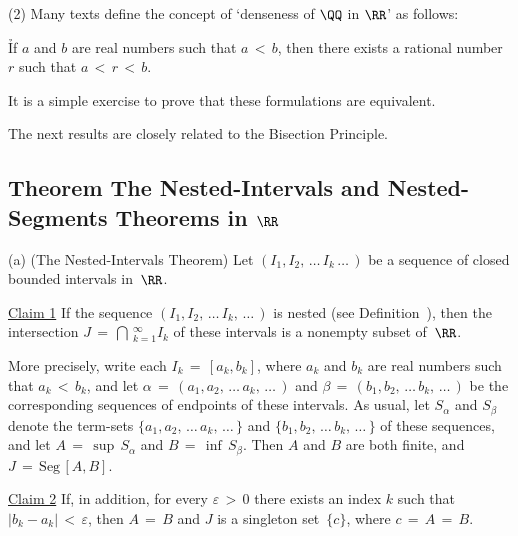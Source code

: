 \V

        (2) Many texts define the concept of `denseness of ${\QQ}$ in ${\RR}$' as follows:

\VA

        \h If $a$ and $b$ are real numbers such that $a\,<\,b$,
    then there exists a rational number $r$ such that $a\,<\,r\,<\,b$.

\VA

\hspace*{\parindent} It is a simple exercise to prove that these formulations are equivalent. %

\VV

        The next results are closely related to the Bisection Principle.

\V


            \subsection{\small{\bf Theorem} The Nested-Intervals and Nested-Segments Theorems in ${\RR}$}
            \label{ThmC20.40}

\V

\hspace*{\parindent}(a) (The Nested-Intervals Theorem) Let $(I_{1}, I_{2},\,{\ldots}\,I_{k}\,{\ldots}\,)$
    be a sequence of closed bounded intervals in~${\RR}$.

         \underline{Claim 1} If the sequence $(I_{1}, I_{2},\,{\ldots}\,I_{k},\,{\ldots}\,)$ is nested
    (see Definition~), then the intersection $J \,=\, {\bigcap}\,_{k=1}^{{\infty}} I_{k}$
    of these intervals is a nonempty subset of~${\RR}$.

        More precisely, write each $I_{k} \,=\, [a_{k},b_{k}]$, where $a_{k}$ and $b_{k}$ are real numbers such that $a_{k}\,<\,b_{k}$,
    and let ${\alpha} \,=\, (a_{1}, a_{2},\,{\ldots}\,a_{k},\,{\ldots}\,)$ and ${\beta} \,=\, (b_{1}, b_{2},\,{\ldots}\,b_{k},\,{\ldots}\,)$
    be the corresponding sequences of endpoints of these intervals. As usual, let $S_{{\alpha}}$ and $S_{{\beta}}$ denote the term-sets
    $\{a_{1}, a_{2},\,{\ldots}\,a_{k}, \,{\ldots}\,\}$ and $\{b_{1},b_{2},\,{\ldots}\,b_{k},\,{\ldots}\,\}$ of these sequences,
    and let $A \,=\, {\sup}\,S_{{\alpha}}$ and $B \,=\, {\inf}\,S_{{\beta}}$. Then $A$ and $B$ are both finite, and $J \,=\, \mbox{Seg}\,[A,B]$.

        \underline{Claim 2} If, in addition, for every ${\varepsilon}\,>\,0$ there exists an index $k$ such that $|b_{k}-a_{k}|\,<\,{\varepsilon}$,
    then $A \,=\, B$ and $J$ is a singleton set~$\{c\}$, where $c \,=\, A \,=\, B$.

